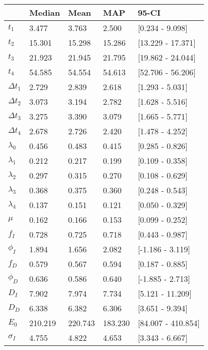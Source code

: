 \begin{tabular}{lllll}
\toprule
{} &   Median &     Mean &      MAP &               95-CI \\
\midrule
$t_1$        &    3.477 &    3.763 &    2.500 &     [0.234 - 9.098] \\
$t_2$        &   15.301 &   15.298 &   15.286 &   [13.229 - 17.371] \\
$t_3$        &   21.923 &   21.945 &   21.795 &   [19.862 - 24.044] \\
$t_4$        &   54.585 &   54.554 &   54.613 &   [52.706 - 56.206] \\
$\Delta t_1$ &    2.729 &    2.839 &    2.618 &     [1.293 - 5.031] \\
$\Delta t_2$ &    3.073 &    3.194 &    2.782 &     [1.628 - 5.516] \\
$\Delta t_3$ &    3.275 &    3.390 &    3.079 &     [1.665 - 5.771] \\
$\Delta t_4$ &    2.678 &    2.726 &    2.420 &     [1.478 - 4.252] \\
$\lambda_0$  &    0.456 &    0.483 &    0.415 &     [0.285 - 0.826] \\
$\lambda_1$  &    0.212 &    0.217 &    0.199 &     [0.109 - 0.358] \\
$\lambda_2$  &    0.297 &    0.315 &    0.270 &     [0.108 - 0.629] \\
$\lambda_3$  &    0.368 &    0.375 &    0.360 &     [0.248 - 0.543] \\
$\lambda_4$  &    0.137 &    0.151 &    0.121 &     [0.050 - 0.329] \\
$\mu$        &    0.162 &    0.166 &    0.153 &     [0.099 - 0.252] \\
$f_I$        &    0.728 &    0.725 &    0.718 &     [0.443 - 0.987] \\
$\phi_I$     &    1.894 &    1.656 &    2.082 &    [-1.186 - 3.119] \\
$f_D$        &    0.579 &    0.567 &    0.594 &     [0.187 - 0.885] \\
$\phi_D$     &    0.636 &    0.586 &    0.640 &    [-1.885 - 2.713] \\
$D_I$        &    7.902 &    7.974 &    7.734 &    [5.121 - 11.209] \\
$D_D$        &    6.338 &    6.382 &    6.306 &     [3.651 - 9.394] \\
$E_0$        &  210.219 &  220.743 &  183.230 &  [84.007 - 410.854] \\
$\sigma_I$   &    4.755 &    4.822 &    4.653 &     [3.343 - 6.667] \\

\end{tabular}
